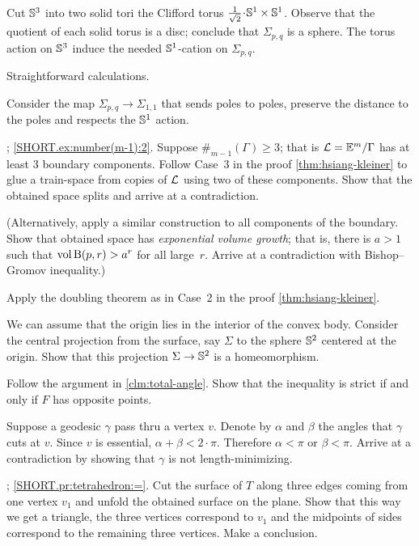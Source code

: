 Cut $\mathbb{S}^3$ into two solid tori the Clifford torus $\tfrac1{\sqrt2}\cdot \SSS^1\times \SSS^1$.
Observe that the quotient of each solid torus is a disc;
conclude that $\Sigma_{p,q}$ is a sphere.
The torus action on $\mathbb{S}^3$ induce the needed $\mathbb{S}^1$-cation on $\Sigma_{p,q}$.

 Straightforward calculations.

Consider the map $\Sigma_{p,q}\to\Sigma_{1,1}$ that sends poles to poles,
preserve the distance to the poles and respects the $\mathbb{S}^1$ action.

\parbf{\ref{ex:number(m-1)}};
\ref{SHORT.ex:number(m-1):2}.
Suppose $\#_{m-1}(\Gamma)\ge 3$;
that is $\mathcal{L}=\mathbb{E}^m/\Gamma$ has at least 3 boundary components.
Follow Case~3 in the proof \ref{thm:hsiang-kleiner} to glue a train-space from copies of $\mathcal{L}$ using two of these components.
Show that the obtained space splits and arrive at a contradiction.

(Alternatively, apply a similar construction to all components of the boundary.
Show that obtained space has {}\emph{exponential volume growth};
that is, there is $a>1$ such that $\operatorname{\rm vol}\nolimits \mathrm{B}{}(p,r)>a^r$ for all large~$r$.
Arrive at a contradiction with Bishop--Gromov inequality.)

Apply the doubling theorem as in Case~2 in the proof \ref{thm:hsiang-kleiner}.

We can assume that the origin lies in the interior of the convex body.
Consider the central projection from the surface, say $\Sigma$ to the sphere $\mathbb{S}^2$ centered at the origin.
Show that this projection $\Sigma\to \mathbb{S}^2$ is a homeomorphism.

Follow the argument in \ref{clm:total-angle}.
Show that the inequality is strict if and only if $F$ has opposite points.


 Suppose a geodesic $\gamma$ pass thru a vertex $v$.
Denote by $\alpha$ and $\beta$ the angles that $\gamma$ cuts at $v$.
Since $v$ is essential, $\alpha+\beta<2\cdot\pi$.
Therefore $\alpha<\pi$ or $\beta<\pi$.
Arrive at a contradiction by showing that $\gamma$ is not length-minimizing.

\parbf{\ref{pr:tetrahedron}}; \ref{SHORT.pr:tetrahedron:=}.
Cut the surface of $T$ along three edges coming from one vertex $v_1$ and unfold the obtained surface on the plane.
Show that this way we get a triangle, the three vertices correspond to $v_1$ and the midpoints of sides correspond to the remaining three vertices.
Make a conclusion.

